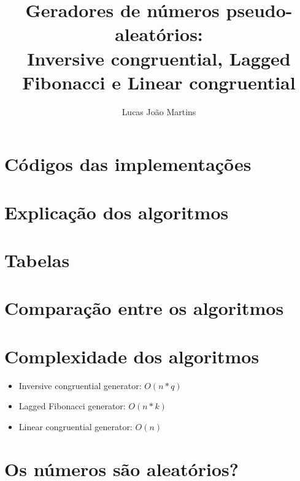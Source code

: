 \documentclass[12pt]{article}
\title{
  Geradores de números pseudo-aleatórios: \\
  \large Inversive congruential, Lagged Fibonacci e Linear congruential}
\author{Lucas João Martins}
\date{}
\begin{document}
\maketitle

\section{Códigos das implementações}




\section{Explicação dos algoritmos}



\section{Tabelas}

\section{Comparação entre os algoritmos}

\section{Complexidade dos algoritmos}
\begin{itemize}
  \item Inversive congruential generator: $O(n * q)$
  \item Lagged Fibonacci generator: $O(n * k)$
  \item Linear congruential generator: $O(n)$
\end{itemize}

\section{Os números são aleatórios?}
\end{document}

